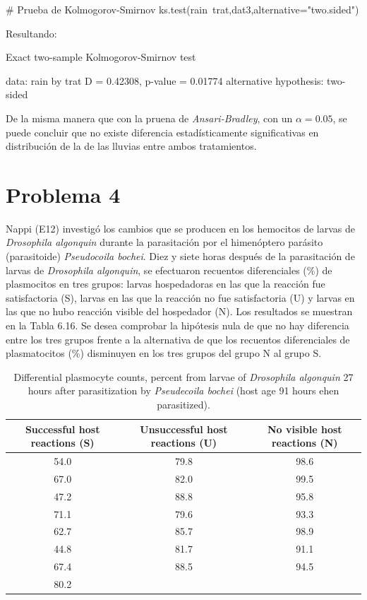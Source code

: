 \documentclass[a4paper,12pt]{article}
\begin{document}
\begin{enumerate} [label=\textbf{\alph*})]
\begin{MyVerbatim}
# Prueba de  Kolmogorov-Smirnov
ks.test(rain~trat,dat3,alternative="two.sided")	
\end{MyVerbatim}
Resultando:
\begin{MyVerbatim}
Exact two-sample Kolmogorov-Smirnov test

data:  rain by trat
D = 0.42308, p-value = 0.01774
alternative hypothesis: two-sided
\end{MyVerbatim}
De la misma manera que con la pruena de \textit{Ansari-Bradley}, con un \(\alpha=0.05\), se puede concluir que no existe diferencia estadísticamente significativas en distribución de la de las lluvias entre ambos tratamientos.
\end{enumerate}

\newpage
\section*{Problema 4}
Nappi (E12) investigó los cambios que se producen en los hemocitos de larvas de \textit{Drosophila algonquin} durante la parasitación por el himenóptero parásito (parasitoide) \textit{Pseudocoila bochei}. Diez y siete horas después de la parasitación de larvas de \textit{Drosophila algonquin}, se efectuaron recuentos diferenciales (\%) de plasmocitos en tres grupos: larvas hospedadoras en las que la reacción fue satisfactoria (S), larvas en las que la reacción no fue satisfactoria (U) y larvas en las que no hubo reacción visible del hospedador (N). Los resultados se muestran en la Tabla 6.16. Se desea comprobar la hipótesis nula de que no hay diferencia entre los tres grupos frente a la alternativa de que los recuentos diferenciales de plasmatocitos (\%) disminuyen en los tres grupos del grupo N al grupo S.
\begin{center}
	\begin{table}[H]
		\centering
		\caption{Differential plasmocyte counts, percent from larvae of \textit{Drosophila algonquin} 27 hours after parasitization by \textit{Pseudecoila bochei} (host age 91 hours ehen parasitized).}
		\begin{tabular}{ccc}
			\toprule[1.5 pt]
			Successful host reactions (S) & Unsuccessful host reactions (U)& No visible host reactions (N) \\
			\midrule
			54.0&79.8&98.6\\
			67.0&82.0&99.5\\
			47.2&88.8&95.8\\
			71.1&79.6&93.3\\
			62.7&85.7&98.9\\
			44.8&81.7&91.1\\
			67.4&88.5&94.5\\
			80.2&&\\
			\bottomrule[1.5pt]
		\end{tabular}
		\label{tab:my_label4}
	\end{table}
\end{center}
\end{document}
